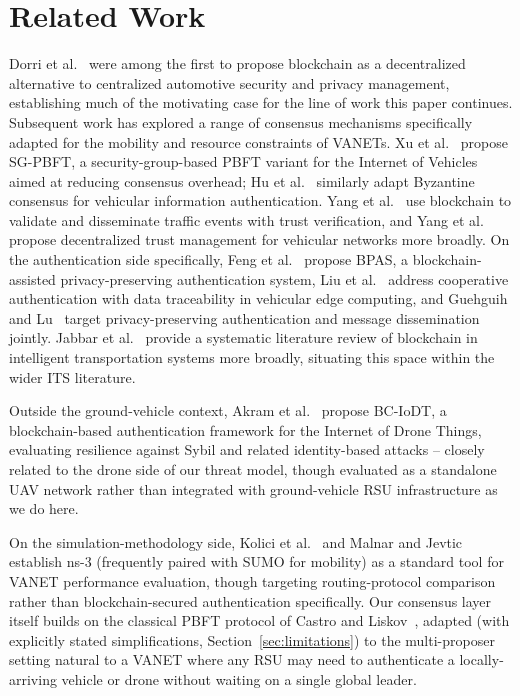 \documentclass[conference]{IEEEtran}
\begin{document}
\section{Related Work}

Dorri et al.~\cite{dorri2017blockchain} were among the first to
propose blockchain as a decentralized alternative to centralized
automotive security and privacy management, establishing much of the
motivating case for the line of work this paper continues.
Subsequent work has explored a range of consensus mechanisms
specifically adapted for the mobility and resource constraints of
VANETs. Xu et al.~\cite{xu2022sgpbft} propose SG-PBFT, a
security-group-based PBFT variant for the Internet of Vehicles aimed
at reducing consensus overhead; Hu et al.~\cite{hu2019byzantine}
similarly adapt Byzantine consensus for vehicular information
authentication. Yang et al.~\cite{yang2019traffic} use blockchain to
validate and disseminate traffic events with trust verification, and
Yang et al.~\cite{yang2018trust} propose decentralized trust
management for vehicular networks more broadly. On the
authentication side specifically, Feng et al.~\cite{feng2020bpas}
propose BPAS, a blockchain-assisted privacy-preserving authentication
system, Liu et al.~\cite{liu2020cooperative} address cooperative
authentication with data traceability in vehicular edge computing,
and Guehguih and Lu~\cite{guehguih2019privacy} target
privacy-preserving authentication and message dissemination jointly.
Jabbar et al.~\cite{jabbar2022blockchain} provide a systematic
literature review of blockchain in intelligent transportation systems
more broadly, situating this space within the wider ITS literature.

Outside the ground-vehicle context, Akram et al.~\cite{akram2022bciodt}
propose BC-IoDT, a blockchain-based authentication framework for the
Internet of Drone Things, evaluating resilience against Sybil and
related identity-based attacks -- closely related to the drone side
of our threat model, though evaluated as a standalone UAV network
rather than integrated with ground-vehicle RSU infrastructure as we
do here.

On the simulation-methodology side, Kolici et
al.~\cite{kolici2015performance} and Malnar and
Jevtic~\cite{malnar2020framework} establish ns-3 (frequently paired
with SUMO for mobility) as a standard tool for VANET performance
evaluation, though targeting routing-protocol comparison rather than
blockchain-secured authentication specifically. Our consensus layer
itself builds on the classical PBFT protocol of Castro and
Liskov~\cite{castro1999pbft}, adapted (with explicitly stated
simplifications, Section~\ref{sec:limitations}) to the multi-proposer
setting natural to a VANET where any RSU may need to authenticate a
locally-arriving vehicle or drone without waiting on a single global
leader.
\end{document}
